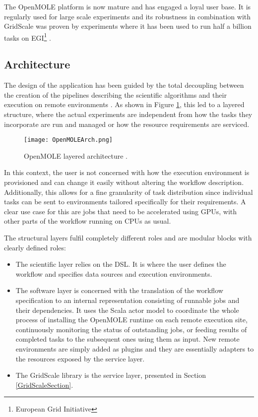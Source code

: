 The OpenMOLE platform is now mature and has engaged a loyal user base. It is regularly used for large scale experiments and its robustness in combination with GridScale was proven by experiments where it has been used to run half a billion tasks on EGI\footnote{European Grid Initiative} \cite{Schmitt2015}.

\subsection{Architecture}

The design of the application has been guided by the total decoupling between the creation of the pipelines describing the scientific algorithms and their execution on remote environments \cite{Leclaire2016}. As shown in Figure \ref{OpenMOLEArch}, this led to a layered structure, where the actual experiments are independent from how the tasks they incorporate are run and managed or how the resource requirements are serviced.

\begin{figure}[h]
	\centering
		\texttt{[image: OpenMOLEArch.png]}
	\caption{OpenMOLE layered architecture \cite{Reuillon2010}.}
	\label{OpenMOLEArch}
\end{figure}

In this context, the user is not concerned with how the execution environment is provisioned and can change it easily without altering the workflow description. Additionally, this allows for a fine granularity of task distribution since individual tasks can be sent to environments tailored specifically for their requirements. A clear use case for this are jobs that need to be accelerated using GPUs, with other parts of the workflow running on CPUs as usual.

The structural layers fulfil completely different roles and are modular blocks with clearly defined roles:
\begin{itemize}
	\item The scientific layer relies on the DSL. It is where the user defines the workflow and specifies data sources and execution environments.
	\item The software layer is concerned with the translation of the workflow specification to an internal representation consisting of runnable jobs and their dependencies. It uses the Scala actor model \cite{ScalaActors} to coordinate the whole process of installing the OpenMOLE runtime on each remote execution site, continuously monitoring the status of outstanding jobs, or feeding results of completed tasks to the subsequent ones using them as input. New remote environments are simply added as plugins and they are essentially adapters to the resources exposed by the service layer.
	\item The GridScale library is the service layer, presented in Section \ref{GridScaleSection}.
\end{itemize}

